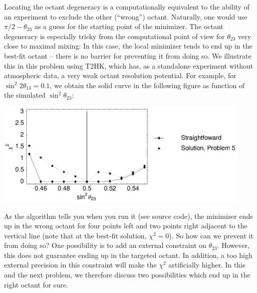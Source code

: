 \documentclass[12pt,a4paper]{article}
\begin{document}
Locating the octant degeneracy is a computationally equivalent to the ability of an experiment to exclude the
other (``wrong'') octant. Naturally, one would use 
$\pi/2 - \theta_{23}$ as a guess for the starting point of the minimizer.
The octant degeneracy is especially tricky from the computational point of view 
for $\theta_{23}$ very close to maximal mixing: In this case, the local minimizer tends to end up
in the best-fit octant -- there is no barrier for preventing it from doing so. We illustrate this in this problem using T2HK, which has, as a standalone experiment without atmospheric data, a very weak octant resolution potential. 
For example, for $\sin^2 2 \theta_{13}=0.1$, we obtain the solid curve in the following figure as function of the simulated $\sin^2 \theta_{23}$:
\begin{center}
\includegraphics[height=5cm]{problem5}
\end{center}
As the algorithm tells you when you run it (see source code), the minimizer ends up in the wrong octant
for four points left and two points right adjacent to the vertical line (note that at the best-fit solution, $\chi^2 = 0$). So how can we prevent it from doing so? One possibility is to add an external constraint on $\theta_{23}$. However, this does not guarantee ending up in the targeted octant. In addition, a too high external precision in this constraint will make the $\chi^2$ artificially higher. In this and the next problem, we therefore discuss two possibilities which end up in the right octant for sure.
 
\vspace*{3mm}
\end{document}
